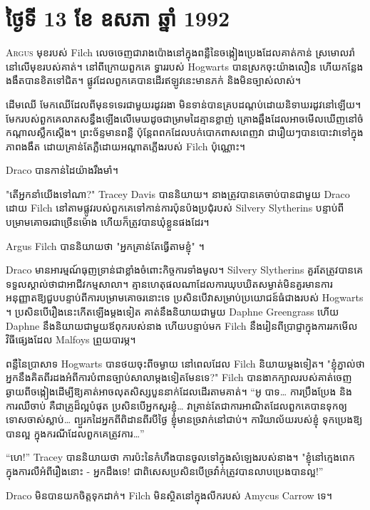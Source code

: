 
\section{ថ្ងៃទី 13 ខែ ឧសភា ឆ្នាំ 1992}

\lettrine{A}{rgus} មុខរបស់ Filch លេចចេញជារាងប៉ោងនៅក្នុងពន្លឺនៃចង្កៀងប្រេងដែលគាត់កាន់ ស្រមោលរាំនៅលើមុខរបស់គាត់។ នៅពីក្រោយពួកគេ ទ្វាររបស់ Hogwarts បានស្រកចុះយ៉ាងលឿន ហើយកន្លែងងងឹតបានខិតទៅជិត។ ផ្លូវ​ដែល​ពួក​គេ​បាន​ដើរ​ឥឡូវ​នេះ​មាន​ភក់ និង​មិន​ច្បាស់​លាស់។

ដើមឈើ មែកឈើដែលពីមុនទទេរជាមួយរដូវរងា មិនទាន់បានគ្របដណ្ដប់ដោយនិទាឃរដូវនៅឡើយ។ មែករបស់ពួកគេលាតសន្ធឹងឡើងលើមេឃដូចជាម្រាមដៃគ្មានខ្លាញ់ គ្រោងឆ្អឹងដែលអាចមើលឃើញនៅចំកណ្តាលស្លឹកស្តើង។ ព្រះច័ន្ទមានពន្លឺ ប៉ុន្តែពពកដែលបក់បោកពាសពេញវា ជារឿយៗបានបោះវាទៅក្នុងភាពងងឹត ដោយគ្រាន់តែភ្លឺដោយអណ្តាតភ្លើងរបស់ Filch ប៉ុណ្ណោះ។

Draco បាន​កាន់​ដៃ​យ៉ាង​រឹង​មាំ។

"តើអ្នកនាំយើងទៅណា?" Tracey Davis បាននិយាយ។ នាងត្រូវបានគេចាប់បានជាមួយ Draco ដោយ Filch នៅតាមផ្លូវរបស់ពួកគេទៅកាន់ការប៉ុនប៉ងប្រជុំរបស់ Silvery Slytherins បន្ទាប់ពីបម្រាមគោចរជាច្រើនម៉ោង ហើយក៏ត្រូវបានឃុំខ្លួនផងដែរ។

Argus Filch បាននិយាយថា "អ្នកគ្រាន់តែធ្វើតាមខ្ញុំ" ។

Draco មាន​អារម្មណ៍​ធុញ​ទ្រាន់​ជា​ខ្លាំង​ចំពោះ​កិច្ចការ​ទាំង​មូល។ Silvery Slytherins គួរតែត្រូវបានគេទទួលស្គាល់ថាជាអាជីវកម្មសាលា។ គ្មានហេតុផលណាដែលការឃុបឃិតសម្ងាត់មិនគួរមានការអនុញ្ញាតឱ្យជួបបន្ទាប់ពីការបម្រាមគោចរនោះទេ ប្រសិនបើវាសម្រាប់ប្រយោជន៍ធំជាងរបស់ Hogwarts ។ ប្រសិនបើរឿងនេះកើតឡើងម្ដងទៀត គាត់នឹងនិយាយជាមួយ Daphne Greengrass ហើយ Daphne នឹងនិយាយជាមួយឪពុករបស់នាង ហើយបន្ទាប់មក Filch នឹងរៀនពីប្រាជ្ញាក្នុងការរកមើលវិធីផ្សេងដែល Malfoys ព្រួយបារម្ភ។

ពន្លឺនៃប្រាសាទ Hogwarts បានថយចុះពីចម្ងាយ នៅពេលដែល Filch និយាយម្តងទៀត។ "ខ្ញុំភ្នាល់ថាអ្នកនឹងគិតពីរដងអំពីការបំពានច្បាប់សាលាម្តងទៀតមែនទេ?" Filch បានងាកក្បាលរបស់គាត់ចេញឆ្ងាយពីចង្កៀងដើម្បីឱ្យគាត់អាចលុតសិស្សបួននាក់ដែលដើរតាមគាត់។ “អូ បាទ… ការប្រឹងប្រែង និងការឈឺចាប់ គឺជាគ្រូដ៏ល្អបំផុត ប្រសិនបើអ្នកសួរខ្ញុំ… វាគ្រាន់តែជាការអាណិតដែលពួកគេបានទុកឲ្យទោសចាស់ស្លាប់… ព្យួរកដៃអ្នកពីពិដានពីរបីថ្ងៃ ខ្ញុំមានច្រវាក់នៅជាប់។ ការិយាល័យរបស់ខ្ញុំ ទុកប្រេងឱ្យបានល្អ ក្នុងករណីដែលពួកគេត្រូវការ…”

“ហេ!” Tracey បាននិយាយថា ការប៉ះនៃកំហឹងបានចូលទៅក្នុងសំឡេងរបស់នាង។ "ខ្ញុំនៅក្មេងពេកក្នុងការលឺអំពីរឿងនោះ - អ្នកដឹងទេ! ជាពិសេសប្រសិនបើច្រវ៉ាក់ត្រូវបានលាបប្រេងបានល្អ!”

Draco មិន​បាន​យក​ចិត្ត​ទុក​ដាក់។ Filch មិនស្ថិតនៅក្នុងលីករបស់ Amycus Carrow ទេ។

